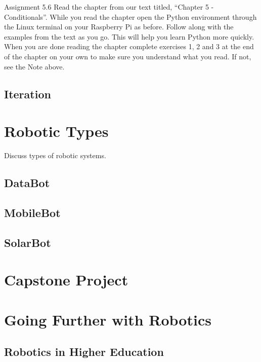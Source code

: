 \documentclass[
]{book}
\begin{document}
Assignment 5.6
Read the chapter from our text titled, ``Chapter 5 - Conditionals''. While you read the chapter open the Python environment through the Linux terminal on your Raspberry Pi as before. Follow along with the examples from the text as you go. This will help you learn Python more quickly. When you are done reading the chapter complete exercises 1, 2 and 3 at the end of the chapter on your own to make sure you understand what you read. If not, see the Note above.

\hypertarget{iteration}{%
\section{Iteration}\label{iteration}}

\hypertarget{robotic-types}{%
\chapter{Robotic Types}\label{robotic-types}}

Discuss types of robotic systems.

\hypertarget{databot}{%
\section{DataBot}\label{databot}}

\hypertarget{mobilebot}{%
\section{MobileBot}\label{mobilebot}}

\hypertarget{solarbot}{%
\section{SolarBot}\label{solarbot}}

\hypertarget{capstone-project}{%
\chapter{Capstone Project}\label{capstone-project}}

\hypertarget{going-further-with-robotics}{%
\chapter{Going Further with Robotics}\label{going-further-with-robotics}}

\hypertarget{robotics-in-higher-education}{%
\section{Robotics in Higher Education}\label{robotics-in-higher-education}}
\end{document}

